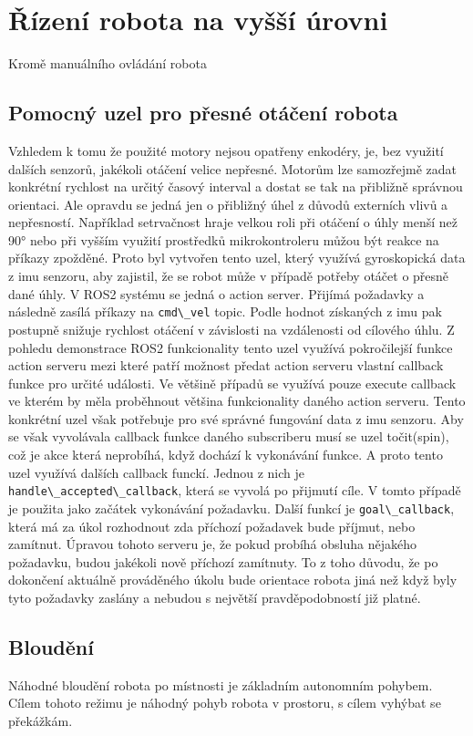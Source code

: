 \section{Řízení robota na vyšší úrovni}
Kromě manuálního ovládání robota 

\subsection{Pomocný uzel pro přesné otáčení robota}
Vzhledem k tomu že použité motory nejsou opatřeny enkodéry, je, bez využití dalších senzorů, jakékoli otáčení velice nepřesné. Motorům lze samozřejmě zadat konkrétní rychlost na určitý časový interval a dostat se tak na přibližně správnou orientaci. Ale opravdu se jedná jen o přibližný úhel z důvodů externích vlivů a nepřesností. Například setrvačnost hraje velkou roli při otáčení o úhly menší než 90° nebo při vyšším využití prostředků mikrokontroleru můžou být reakce na příkazy zpožděné.
Proto byl vytvořen tento uzel, který využívá gyroskopická data z imu senzoru, aby zajistil, že se robot  může v případě potřeby otáčet o přesně dané úhly. V ROS2 systému se jedná o action server. Přijímá požadavky a následně zasílá příkazy na \verb|cmd\_vel| topic. Podle hodnot získaných z imu pak postupně snižuje rychlost otáčení v závislosti na vzdálenosti od cílového úhlu. Z pohledu demonstrace ROS2 funkcionality tento uzel využívá pokročilejší funkce action serveru mezi které patří možnost předat action serveru vlastní callback funkce pro určité události. Ve většině případů se využívá pouze execute callback ve kterém by měla proběhnout většina funkcionality daného action serveru. Tento konkrétní uzel však potřebuje pro své správné fungování data z imu senzoru. Aby se však vyvolávala callback funkce daného subscriberu musí se uzel točit(spin), což je akce která neprobíhá, když dochází k vykonávání funkce. A proto tento uzel využívá dalších callback funckí. Jednou z nich je \verb|handle\_accepted\_callback|, která se vyvolá po přijmutí cíle. V tomto případě je použita jako začátek vykonávání požadavku. Další funkcí je \verb|goal\_callback|, která má za úkol rozhodnout zda příchozí požadavek bude příjmut, nebo zamítnut. Úpravou tohoto serveru je, že pokud probíhá obsluha nějakého požadavku, budou jakékoli nově příchozí zamítnuty. To z toho důvodu, že po dokončení aktuálně prováděného úkolu bude orientace robota jiná než když byly tyto požadavky zaslány a nebudou s největší pravděpodobností již platné.

\subsection*{Bloudění}
Náhodné bloudění robota po místnosti je základním autonomním pohybem. Cílem tohoto režimu je náhodný pohyb robota v prostoru, s cílem vyhýbat se překážkám.

